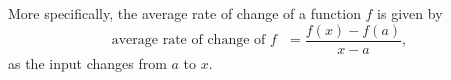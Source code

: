 \documentclass{ximera}
\begin{document}
More specifically, the average rate of change of a function $f$ is given by
\[
{\text{average rate of change of  $f$ }}
=\frac{f(x)-f(a)}{x-a},
\]
as the input changes from $a$ to $x$.
\begin{comment}
\begin{image}
\begin{tikzpicture}
	
          \begin{axis}[
            clip=false, domain=0:2.5, axis lines =middle, xlabel=$x$,
            ylabel=$y$, every axis y label/.style={at=(current
              axis.above origin),anchor=south}, 
             width=4in,
          ticks=none ]   
                             \addplot [very thick, penColor,smooth] {(x-1)^2 };
      
       \addplot[decoration={brace,mirror,raise=.06cm},decorate,thin] plot coordinates
                       {(2,0.45) (2,1)};
                         \addplot[decoration={brace,mirror,raise=.06cm},decorate,thin] plot coordinates
                       {(1.65,0.45) (2,0.45)};
           \node at (axis cs:0,-0.1) {$0$};
             \addplot [very thick,penColor2,->]  plot coordinates {(2,0.45) (2,1)};
             \addplot [very thick,penColor4,->]  plot coordinates {(1.65,0.45) (2,0.45)};
              \addplot [very thick,penColor, dashed]  plot coordinates {(1.65,0) (1.65,0.45)};
               \addplot[only marks,very thick,penColor,mark=*]
	        coordinates{(1.65,0.45)};
	        \addplot[only marks,very thick,penColor,mark=*]
	        coordinates{(2,1)};
              \addplot [very thick,penColor, dashed]  plot coordinates {(2,0) (2,0.45)};
               \node at (axis cs:1.8,0.35) {$\Delta x$ };
    
                \node at (axis cs:2.5,0.71) {$\Delta y=f(x)-f(a)$ };
               \node at (axis cs:1.65,-0.1) {$a$ };
                \node at (axis cs:1.2,1.8) {average rate of change $=\frac{\Delta y}{\Delta x}=\frac{f(x)-f(a)}{x-a}$ };
               \node at (axis cs:2,-0.1) {$x$ };
                 \node at (axis cs:2.3,1) {$(x,f(x))$ };
                  \node at (axis cs:1.35,0.45) {$(a,f(a))$ };
        \end{axis}
\end{tikzpicture}
\end{image}
\end{comment}
\end{document}
